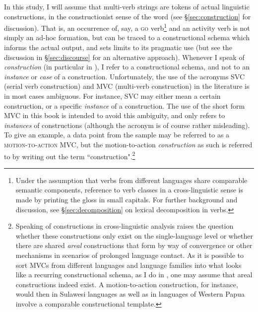 \largerpage[-1]
In this study, I will assume that multi-verb strings are tokens of actual linguistic constructions, in the constructionist sense of the word (see §\ref{sec:construction} for discussion). That is, an occurrence of, say, a \textsc{go} verb\footnote{Under the assumption that verbs from different languages share comparable semantic components, reference to verb classes in a cross-linguistic sense is made by printing the gloss in small capitals. For further background and discussion, see §\ref{sec:decomposition} on lexical decomposition in verbs.} and an activity verb is not simply an ad-hoc formation, but can be traced to a constructional schema which informs the actual output, and sets limits to its pragmatic use (but see the discussion in §\ref{sec:discourse} for an alternative approach). Whenever I speak of \textit{construction} (in particular in ), I refer to a constructional schema, and not to an \emph{instance} or \emph{case} of a construction. Unfortunately, the use of the acronyms SVC (serial verb construction) and MVC (multi-verb construction) in the literature is in most cases ambiguous. For instance, SVC may either mean a certain construction, or a specific \emph{instance} of a construction. The use of the short form MVC in this book is intended to avoid this ambiguity, and only refers to \emph{instances} of constructions (although the acronym is of course rather misleading). To give an example, a data point from the sample may be referred to as a \textsc{motion-to-action} MVC, but the motion-to-action \emph{construction} as such is referred to by writing out the term ``construction".\footnote{Speaking of constructions in cross-linguistic analysis raises the question whether these constructions only exist on the single-language level or whether there are shared \emph{areal} constructions that form by way of convergence or other mechanisms in scenarios of prolonged language contact. As it is possible to sort MVCs from different languages and language families into what looks like a recurring constructional schema, as I do in , one may assume that areal constructions indeed exist. A motion-to-action construction, for instance, would then in Sulawesi languages as well as in languages of Western Papua involve a comparable constructional template.} 

